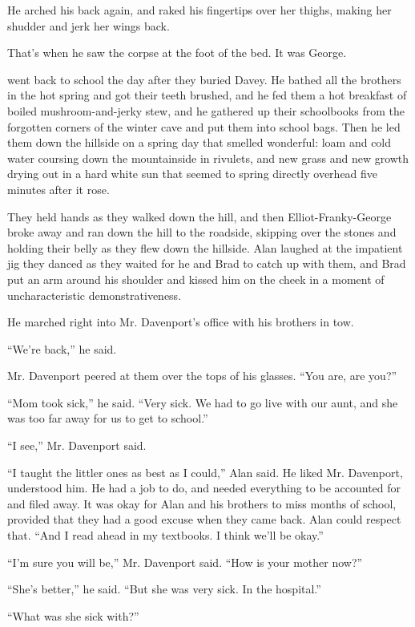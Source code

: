 He arched his back again, and raked his fingertips over her thighs,
making her shudder and jerk her wings back.

That's when he saw the corpse at the foot of the bed.  It was George.

 went back to school the day after they buried Davey.  He bathed all
the brothers in the hot spring and got their teeth brushed, and he fed
them a hot breakfast of boiled mushroom-and-jerky stew, and he
gathered up their schoolbooks from the forgotten corners of the winter
cave and put them into school bags.  Then he led them down the
hillside on a spring day that smelled wonderful:  loam and cold water
coursing down the mountainside in rivulets, and new grass and new
growth drying out in a hard white sun that seemed to spring directly
overhead five minutes after it rose.

They held hands as they walked down the hill, and then
Elliot-Franky-George broke away and ran down the hill to the roadside,
skipping over the stones and holding their belly as they flew down the
hillside.  Alan laughed at the impatient jig they danced as they
waited for he and Brad to catch up with them, and Brad put an arm
around his shoulder and kissed him on the cheek in a moment of
uncharacteristic demonstrativeness.

He marched right into Mr.  Davenport's office with his brothers in
tow.

``We're back,'' he said.

Mr.  Davenport peered at them over the tops of his glasses.  ``You
are, are you?''

``Mom took sick,'' he said.  ``Very sick.  We had to go live with our
aunt, and she was too far away for us to get to school.''

``I see,'' Mr.  Davenport said.

``I taught the littler ones as best as I could,'' Alan said.  He liked
Mr.  Davenport, understood him.  He had a job to do, and needed
everything to be accounted for and filed away.  It was okay for Alan
and his brothers to miss months of school, provided that they had a
good excuse when they came back.  Alan could respect that.  ``And I
read ahead in my textbooks.  I think we'll be okay.''

``I'm sure you will be,'' Mr.  Davenport said.  ``How is your mother
now?''

``She's better,'' he said.  ``But she was very sick.  In the
hospital.''

``What was she sick with?''

